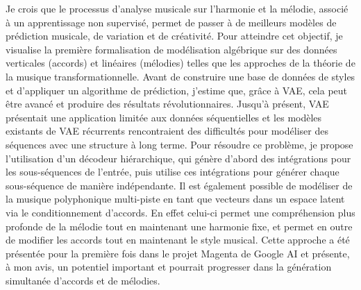 Je crois que le processus d'analyse musicale sur l'harmonie et la mélodie, associé à un apprentissage non supervisé, permet de passer à de meilleurs modèles de prédiction musicale, de variation et de créativité. Pour atteindre cet objectif, je visualise la première formalisation de modélisation algébrique sur des données verticales (accords) et linéaires (mélodies) telles que les approches de la théorie de la musique transformationnelle. Avant de construire une base de données de styles et d’appliquer un algorithme de prédiction, j’estime que, grâce à VAE, cela peut être avancé et produire des résultats révolutionnaires.
Jusqu'à présent, VAE présentait une application limitée aux données séquentielles et les modèles existants de VAE récurrents rencontraient des difficultés pour modéliser des séquences avec une structure à long terme. Pour résoudre ce problème, je propose l’utilisation d’un décodeur hiérarchique, qui génère d’abord des intégrations pour les sous-séquences de l’entrée, puis utilise ces intégrations pour générer chaque sous-séquence de manière indépendante. Il est également possible de modéliser de la musique polyphonique multi-piste en tant que vecteurs dans un espace latent via le conditionnement d'accords. En effet celui-ci permet une compréhension plus profonde de la mélodie tout en maintenant une harmonie fixe, et permet en outre de modifier les accords tout en maintenant le style musical. Cette approche a été présentée pour la première fois dans le projet Magenta de Google AI et présente, à mon avis, un potentiel important et pourrait progresser dans la génération simultanée d'accords et de mélodies.
